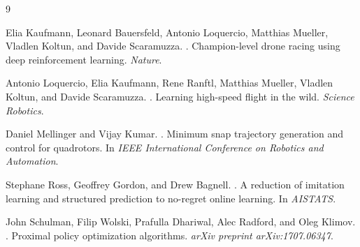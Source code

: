 \documentclass[11pt]{article}
\begin{document}
\begin{thebibliography}{9}

Elia Kaufmann, Leonard Bauersfeld, Antonio Loquercio, Matthias Mueller, Vladlen Koltun, and Davide Scaramuzza.
.
\newblock Champion-level drone racing using deep reinforcement learning.
\newblock \emph{Nature}.

Antonio Loquercio, Elia Kaufmann, Rene Ranftl, Matthias Mueller, Vladlen Koltun, and Davide Scaramuzza.
.
\newblock Learning high-speed flight in the wild.
\newblock \emph{Science Robotics}.

Daniel Mellinger and Vijay Kumar.
.
\newblock Minimum snap trajectory generation and control for quadrotors.
\newblock In \emph{IEEE International Conference on Robotics and Automation}.

Stephane Ross, Geoffrey Gordon, and Drew Bagnell.
.
\newblock A reduction of imitation learning and structured prediction to no-regret online learning.
\newblock In \emph{AISTATS}.

John Schulman, Filip Wolski, Prafulla Dhariwal, Alec Radford, and Oleg Klimov.
.
\newblock Proximal policy optimization algorithms.
\newblock \emph{arXiv preprint arXiv:1707.06347}.

\end{thebibliography}
\end{document}
